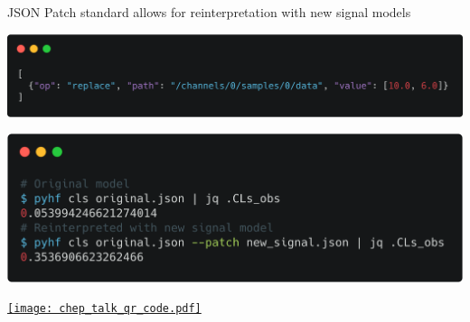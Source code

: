 \documentclass[a0,portrait]{a0poster}
\begin{document}
\begin{multicols}{2}
 JSON Patch standard allows for reinterpretation with new signal models
 \begin{center}
  \includegraphics[width=0.7\linewidth]{carbon_JSON_patch.png}
 \end{center}
 \begin{center}
  \includegraphics[width=0.7\linewidth]{carbon_reinterpretation.png}
 \end{center}

 \begin{minipage}{0.5\linewidth}
 \end{minipage}%
 \quad
 \begin{minipage}{0.5\linewidth}
  \begin{flushleft}
   \href{https://indico.cern.ch/event/773049/contributions/3476143/}{\texttt{[image: chep\_talk\_qr\_code.pdf]}}
  \end{flushleft}
 \end{minipage}%

\end{multicols}
\end{document}
